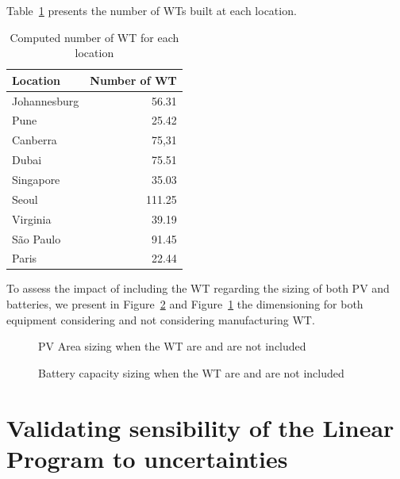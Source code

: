 Table~\ref{tab:results_wt} presents the number of WTs  built at each location. 

\begin{table}[H]
  
  \caption{Computed number of WT for each location}\label{tab:results_wt} \centering

  \begin{tabular}{|l|r|}
   \hline
    
  \textbf{Location} &   \textbf{Number of WT} \\
  \hline
  Johannesburg & 56.31   \\
  \hline
  Pune  & 25.42 \\
  \hline
  Canberra  & 75,31 \\
  \hline
  Dubai   &  75.51  \\
  \hline
  Singapore & 35.03  \\
  \hline     
  Seoul    & 111.25  \\
  \hline
  Virginia   & 39.19 \\
  \hline
  São Paulo   & 91.45 \\
  \hline 
  Paris    &    22.44 \\
  \hline
    
\end{tabular}  
\end{table}


To assess the impact of including the WT regarding the sizing of both PV and batteries, we present in Figure~\ref{fig:wind_bat} and Figure~\ref{fig:wind_pv}  the dimensioning for both equipment considering and not considering manufacturing WT. 

\begin{figure}[H]
  \centering
  {}
  \caption{PV Area sizing when the WT are and are not included }
  \label{fig:wind_pv}
\end{figure}


\begin{figure}[H]
  \centering
  {}
  \caption{Battery capacity sizing when the WT are and are not included }
  \label{fig:wind_bat}
\end{figure}

\section{Validating sensibility of the Linear Program to  uncertainties}

